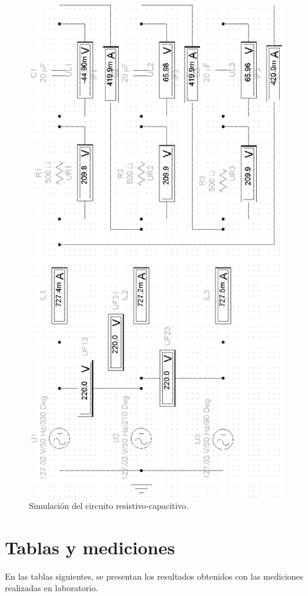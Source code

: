 \documentclass[letter,11pt]{article}
\begin{document}
\begin{figure}[!h]
\centering
\includegraphics[scale=1.08]{simulacion/practica2.3.eps}
\caption{Simulación del circuito resistivo-capacitivo.}
\label{simulacion3}
\end{figure}

\section{Tablas y mediciones}
En las tablas siguientes, se presentan los resultados obtenidos con las
mediciones realizadas en laboratorio.
\end{document}
